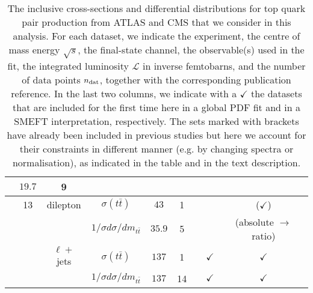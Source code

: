 \begin{table}[H]
\begin{center}
{\begin{tabular}{lcccccc|c|c}
      & $19.7$
      & 9
      & \cite{Khachatryan:2015oqa}
      & 
      & \\\midrule
	& 13
	& dilepton
	& $\sigma(t \bar{t})$
	& $43$
	  & 1
	  & \cite{CMS:2015yky}
      & 
      & ($\checkmark$)\\
      &
      &
       & $1/\sigma d\sigma/dm_{t\bar{t}}$
       & $35.9$
      & 5
      & \cite{Sirunyan:2018ucr}
      & %
      & (absolute $\rightarrow$ ratio)\\   
	& 
	& $\ell+$jets
	& $\sigma(t \bar{t})$
	& $137$
        & 1
        & \cite{CMS:2021vhb}
        & $\checkmark$
       & $\checkmark$\\
      &
      & 
      & $1/\sigma  d\sigma/dm_{t\bar{t}}$
      & $137$
      & 14
      & \cite{CMS:2021vhb}
        & $\checkmark$
       & $\checkmark$\\     
\bottomrule
   \end{tabular}
   \vspace{0.3cm}
   \caption{\small
    The inclusive cross-sections and differential distributions
    for top quark pair production from ATLAS
    and CMS that we consider in this analysis.
    For each dataset, we indicate the experiment,
    the centre of mass energy $\sqrt{s}$, the final-state
    channel, the observable(s) used in the fit, the integrated luminosity $\mathcal{L}$ in inverse femtobarns, and the
    number of data points $n_{\rm dat}$, together
    with the corresponding publication reference.
%
    In the last two columns, we indicate
    with a $\checkmark$ the datasets
    that are included for the first time here in a global PDF fit
    and in a SMEFT interpretation, respectively.
    The sets marked with brackets have already been included in
    previous studies but here we account for their constraints
    in different manner (e.g. by changing spectra or normalisation), as indicated in the table and in the
    text description.
    \label{tab:input_datasets_toppair}
}
}
\end{center}
\end{table}
